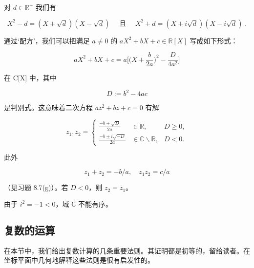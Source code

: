 \begin{remark}
\begin{items}
\item[（f）]

对 $ d \in \mathbb{R}^+ $ 我们有

\[
X^{2}-d=\left(X+\sqrt{d}\right)\left(X-\sqrt{d}\right)\quad\text{ 且 }\quad X^{2}+d=\left(X+i\sqrt{d}\right)\left(X-i\sqrt{d}\right)\;.
\]

通过‘配方’，我们可以把满足 $a \ne 0$ 的 $aX^2 + bX + c \in \mathbb{R}[X]$ 写成如下形式：

\[
a X^{2}+b X+c=a\Big[\Big(X+\frac{b}{2a}\Big)^{2}-\frac{D}{4a^{2}}\Big]
\]

在 C[X] 中，其中

\[
D:=b^{2}-4a c
\]

是判别式。这意味着二次方程 $ az^{2} + bz + c = 0 $ 有解

\begin{equation*}
z_{1},z_{2}=\left\{\begin{array}{lll}\displaystyle\frac{-b\pm\sqrt{D}}{2a}&\in\mathbb{R},&D\geq0,\\ \displaystyle\frac{-b\pm i\sqrt{-D}}{2a}&\in\mathbb{C}\backslash\mathbb{R},&D<0.\end{array}\right.
\end{equation*}

此外

\[
z_{1}+z_{2}=-b/a,\quad z_{1}z_{2}=c/a
\]

（见习题 8.7(g)）。若 $D<0$，则 $z_2=\overline{z}_1$。

\item[（g）]

由于 $ i^{2} = -1 < 0 $，域 $ \mathbb{C} $ 不能有序。

\end{items}

\end{remark}

\subsection*{复数的运算}

在本节中，我们给出复数计算的几条重要法则。其证明都是初等的，留给读者。在坐标平面中几何地解释这些法则是很有启发性的。

